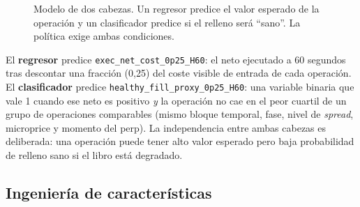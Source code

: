 \begin{figure}[h]
\centering
{}
\caption{Modelo de dos cabezas. Un regresor predice el valor esperado de la operación y un
clasificador predice si el relleno será ``sano''. La política exige ambas condiciones.}
\label{fig:doscabezas}
\end{figure}

El \textbf{regresor} predice \texttt{exec\_net\_cost\_0p25\_H60}: el neto ejecutado a 60
segundos tras descontar una fracción (0,25) del coste visible de entrada de cada operación.
El \textbf{clasificador} predice \texttt{healthy\_fill\_proxy\_0p25\_H60}: una variable
binaria que vale 1 cuando ese neto es positivo \emph{y} la operación no cae en el peor
cuartil de un grupo de operaciones comparables (mismo bloque temporal, fase, nivel de
\emph{spread}, microprice y momento del perp). La independencia entre ambas cabezas es
deliberada: una operación puede tener alto valor esperado pero baja probabilidad de relleno
sano si el libro está degradado.

\subsection{Ingeniería de características}
\label{sec::features}

